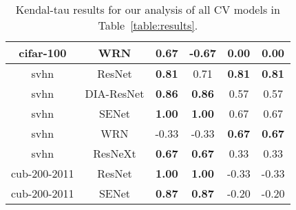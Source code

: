 \begin{table}[t]
\begin{center}
\begin{tabular}{|c|c|c|c|c|c|}
cifar-100 & WRN  & \textbf{0.67} & -0.67 & 0.00 & 0.00 \\
\hline
svhn & ResNet  & \textbf{0.81} & 0.71 & \textbf{0.81} & \textbf{0.81} \\
svhn & DIA-ResNet  & \textbf{0.86} & \textbf{0.86} & 0.57 & 0.57 \\
svhn & SENet  & \textbf{1.00} & \textbf{1.00} & 0.67 & 0.67 \\
svhn & WRN  & -0.33 & -0.33 & \textbf{0.67} & \textbf{0.67} \\
svhn & ResNeXt  & \textbf{0.67} & \textbf{0.67} & 0.33 & 0.33 \\
\hline
cub-200-2011 & ResNet  & \textbf{1.00} & \textbf{1.00} & -0.33 & -0.33 \\
cub-200-2011 & SENet  & \textbf{0.87} & \textbf{0.87} & -0.20 & -0.20 \\

\hline
\end{tabular}
\vspace{-5mm}
\end{center}
\caption{Kendal-tau results for our analysis of all CV models in Table~\ref{table:results}. }
\label{table:Ktauresults}
\end{table}

